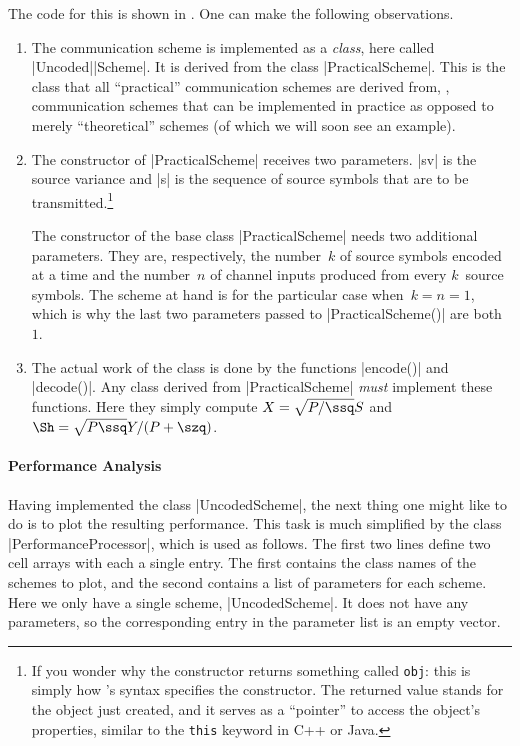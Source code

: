 The code for this is shown in .  One can make the following
observations.
\begin{enumerate}
  \item The communication scheme is implemented as a \emph{class}, here called
    |Uncoded|\-|Scheme|. It is derived from the class |PracticalScheme|. This is
    the class that all ``practical'' communication schemes are derived from,
    \ie,
    communication schemes that can be implemented in practice as opposed to
    merely ``theoretical'' schemes (of which we will soon see an example).

  \item The constructor of |PracticalScheme| receives two parameters. |sv| is
    the source variance and |s| is the sequence of source symbols that are to be
    transmitted.\footnote{If you wonder why the constructor returns something
    called \Verb+obj+: this is simply how \matlab's syntax specifies the
    constructor.  The returned value stands for the object just created, and it
    serves as a ``pointer'' to access the object's properties, similar to the
    \Verb+this+ keyword in C++ or Java.}

    The constructor of the base class |PracticalScheme| needs two additional
    parameters. They are, respectively, the number~$k$ of source symbols encoded
    at a time and the number~$n$ of channel inputs produced from every
    $k$~source symbols. The scheme at hand is for the particular case when~$k =
    n = 1$, which is why the last two parameters passed to |PracticalScheme()|
    are both~$1$.

  \item The actual work of the class is done by the functions |encode()| and
    |decode()|. Any class derived from |PracticalScheme| \emph{must} implement
    these functions. Here they simply compute $X = \sqrt{P/\ssq} S$ and $\Sh =
    \sqrt{P \ssq} Y / (P + \szq)$.
\end{enumerate}


\paragraph{Performance Analysis}

Having implemented the class |UncodedScheme|, the next thing one might like to
do is to plot the resulting performance. This task is much simplified by the
class |PerformanceProcessor|, which is used as follows.
The first two lines define two cell arrays with each a single entry.
The first contains the class names of the schemes to plot, and
the second contains a list of parameters for each scheme. Here we only have a
single scheme, |UncodedScheme|. It does not have any parameters, so the
corresponding entry in the parameter list is an empty vector. 

